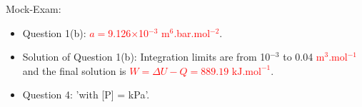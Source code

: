 \documentclass[12pts,a4paper,amsmath,amssymb,floatfix]{article}%
\newcommand{\red}{\textcolor{red}}
\begin{document}
\noindent
{\Large Mock-Exam:}
\begin{itemize}
% 
  \item Question 1(b): \red{$a=$9.126$\times$10$^{-3}$ m$^{6}$.bar.mol$^{-2}$}. 
  \item Solution of Question 1(b): Integration limits are from 10$^{-3}$ to 0.04 \red{m$^{3}$.mol$^{-1}$} and the final solution is \red{$W= \Delta U - Q = 889.19\text{ kJ.mol}^{-1}$}.
  \item Question 4: 'with [P] = kPa'.
%
\end{itemize}
\end{document}
